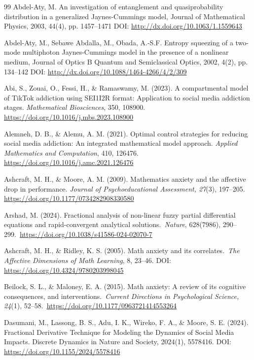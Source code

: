\documentclass[10pt]{NSP1}
\begin{document}
\begin{thebibliography}{99}
 Abdel-Aty, M.
An investigation of entanglement and quasiprobability distribution in a generalized Jaynes-Cummings model, Journal of Mathematical Physics, 2003, 44(4), pp. 1457--1471 DOI: \url{http://dx.doi.org/10.1063/1.1559643}

 Abdel-Aty, M., Sebawe Abdalla, M., Obada, A.-S.F.
Entropy squeezing of a two-mode multiphoton Jaynes-Cummings model in the presence of a nonlinear medium, Journal of Optics B Quantum and Semiclassical Optics, 2002, 4(2), pp. 134--142 DOI: \url{http://dx.doi.org/10.1088/1464-4266/4/2/309}

Abi, S., Zouai, O., Fessi, H., \& Ramaswamy, M. (2023). A compartmental model of TikTok addiction using SEI1I2R format: Application to social media addiction stages. \emph{Mathematical Biosciences}, 350, 108900. \url{https://doi.org/10.1016/j.mbs.2023.108900}

Alemneh, D. B., \& Alemu, A. M. (2021). Optimal control strategies for reducing social media addiction: An integrated mathematical model approach. \emph{Applied Mathematics and Computation}, 410, 126476. \url{https://doi.org/10.1016/j.amc.2021.126476}

Ashcraft, M. H., \& Moore, A. M. (2009). Mathematics anxiety and the affective drop in performance. \emph{Journal of Psychoeducational Assessment, 27}(3), 197--205. \url{https://doi.org/10.1177/0734282908330580}

Arshad, M. (2024). Fractional analysis of non-linear fuzzy partial differential equations and rapid-convergent analytical solutions.~\emph{Nature}, 628(7986), 290--299.~\url{https://doi.org/10.1038/s41586-024-02070-7}

Ashcraft, M. H., \& Ridley, K. S. (2005). Math anxiety and its correlates.~\emph{The Affective Dimensions of Math Learning}, 8, 23--46. DOI: \url{https://doi.org/10.4324/9780203998045}

Beilock, S. L., \& Maloney, E. A. (2015). Math anxiety: A review of its cognitive consequences, and interventions.~\emph{Current Directions in Psychological Science, 24}(1), 52--58.~\url{https://doi.org/10.1177/0963721414553264}

Dasumani, M., Lassong, B. S., Adu, I. K., Wireko, F. A., \& Moore, S. E. (2024). Fractional Derivative Technique for Modeling the Dynamics of Social Media Impacts. Discrete Dynamics in Nature and Society, 2024(1), 5578416. DOI: \url{https://doi.org/10.1155/2024/5578416}


\end{thebibliography}
\end{document}
